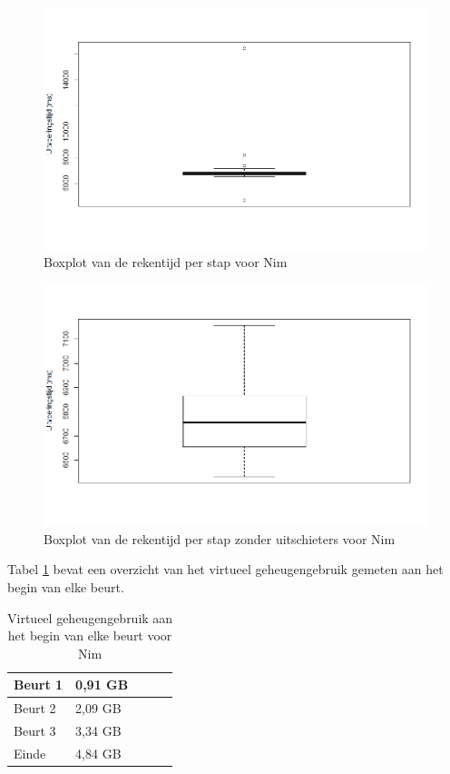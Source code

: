 \begin{figure}
	\includegraphics[width=1.05\textwidth]{chap-evaluatie/boxplot.png}
	\caption{Boxplot van de rekentijd per stap voor Nim}
	\label{fig:ms}
\end{figure}

\begin{figure}
	\includegraphics[width=1.05\textwidth]{chap-evaluatie/boxplotnooutliers.png}
	\caption{Boxplot van de rekentijd per stap zonder uitschieters voor Nim}
	\label{fig:ms-nooutliers}
\end{figure}

Tabel \ref{tab:sim-mem} bevat een overzicht van het virtueel geheugengebruik gemeten aan het begin van elke beurt.


\begin{table}[]
	\centering
	\begin{tabular}{|l|l|l|l|l|}
		\hline
		Beurt 1 & 0,91 GB  \\ \hline
		Beurt 2 & 2,09 GB  \\ \hline
		Beurt 3 & 3,34 GB  \\ \hline
		Einde   & 4,84 GB  \\ \hline
	\end{tabular}
	\caption{Virtueel geheugengebruik aan het begin van elke beurt voor Nim}
	\label{tab:sim-mem}
\end{table}

